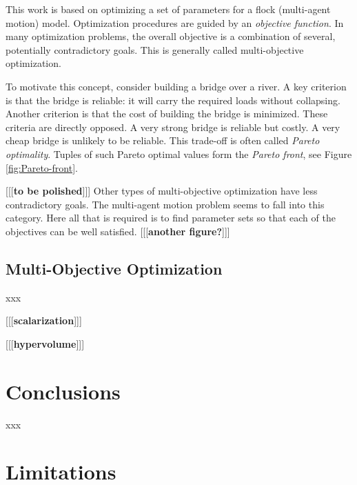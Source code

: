 \documentclass[letterpaper]{article}
\begin{document}
This work is based on optimizing a set of parameters for a flock (multi-agent motion) model. Optimization procedures are guided by an \textit{objective function}. In many optimization problems, the overall objective is a combination of several, potentially contradictory goals. This is generally called multi-objective optimization. 

To motivate this concept, consider building a bridge over a river. A key criterion is that the bridge is reliable: it will carry the required loads without collapsing. Another criterion is that the cost of building the bridge is minimized. These criteria are directly opposed. A very strong bridge is reliable but costly. A very cheap bridge is unlikely to be reliable. This trade-off is often called \textit{Pareto optimality}. Tuples of such Pareto optimal values form the \textit{Pareto front}, see Figure \ref{fig:Pareto-front}.


[[[\textbf{to be polished}]]] Other types of multi-objective optimization have less contradictory goals. The multi-agent motion problem seems to fall into this category. Here all that is required is to find parameter sets so that each of the objectives can be well satisfied. [[[\textbf{another figure?}]]]

\subsection{Multi-Objective Optimization}
\label{subsec:Multi-Objective}

xxx

[[[\textbf{scalarization}]]]

[[[\textbf{hypervolume}]]]

\section{Conclusions}
\label{sec:Conclusions}

xxx

\section{Limitations}
\label{sec:limitations}
\end{document}
